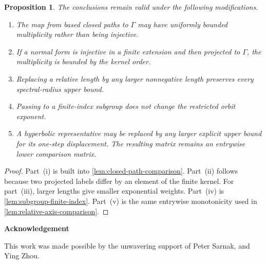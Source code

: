 \documentclass[11pt]{article}
\newtheorem{proposition}[proposition]{Proposition}
\theoremstyle{definition}
\begin{document}
\begin{proposition}
\label{prop:stable-variants}
The conclusions remain valid under the following modifications.
\begin{enumerate}[label=\textup{(\roman*)}]
\item The map from based closed paths to $\Gamma$ may have uniformly bounded multiplicity
rather than being injective.
\item If a normal form is injective in a finite extension and then projected to $\Gamma$, the
multiplicity is bounded by the kernel order.
\item Replacing a relative length by any larger nonnegative length preserves every spectral-radius upper
bound.
\item Passing to a finite-index subgroup does not change the restricted orbit exponent.
\item A hyperbolic representative may be replaced by any larger explicit upper bound for its
one-step displacement. The resulting matrix remains an entrywise lower comparison matrix.
\end{enumerate}
\end{proposition}

\begin{proof}
Part~\textup{(i)} is built into \cref{lem:closed-path-comparison}.  Part~\textup{(ii)} follows
because two projected labels differ by an element of the finite kernel.  For
part~\textup{(iii)}, larger lengths give smaller exponential weights.  Part~\textup{(iv)} is
\cref{lem:subgroup-finite-index}.  Part~\textup{(v)} is the same entrywise monotonicity used in
\cref{lem:relative-axis-comparison}.
\end{proof}
\begin{center}
    \textbf{Acknowledgement}
\end{center}

This work was made possible by the unwavering support of Peter Sarnak, and Ying Zhou.  \par
\end{document}
